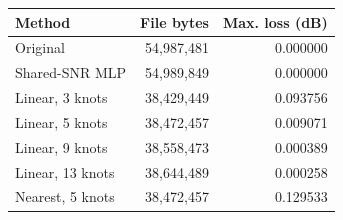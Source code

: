 \begin{tabular}{lrr}
\toprule
Method & File bytes & Max. loss (dB) \\
\midrule
Original & 54,987,481 & 0.000000 \\
Shared-SNR MLP & 54,989,849 & 0.000000 \\
Linear, 3 knots & 38,429,449 & 0.093756 \\
Linear, 5 knots & 38,472,457 & 0.009071 \\
Linear, 9 knots & 38,558,473 & 0.000389 \\
Linear, 13 knots & 38,644,489 & 0.000258 \\
Nearest, 5 knots & 38,472,457 & 0.129533 \\
\bottomrule
\end{tabular}
